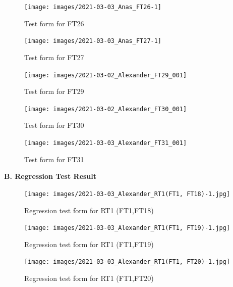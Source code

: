 \documentclass{article}
\begin{document}
 \begin{figure}
     \centering
    \texttt{[image: images/2021-03-03\_Anas\_FT26-1]}
     \renewcommand\figurename{Figure}
     \caption{Test form for FT26}
     \label{fig:my_label}
 \end{figure}
 
 \begin{figure}
     \centering
     \texttt{[image: images/2021-03-03\_Anas\_FT27-1]}
     \renewcommand\figurename{Figure}
     \caption{Test form for FT27}
     \label{fig:my_label}
 \end{figure}
 
 \begin{figure}
     \centering
      \texttt{[image: images/2021-03-02\_Alexander\_FT29\_001]}
     \renewcommand\figurename{Figure}
     \caption{Test form for FT29}
     \label{fig:my_label}
 \end{figure}
 
 \begin{figure}
     \centering
     \texttt{[image: images/2021-03-02\_Alexander\_FT30\_001]}
     \renewcommand\figurename{Figure}
     \caption{Test form for FT30}
     \label{fig:my_label}
 \end{figure}
 
 \begin{figure}
     \centering
     \texttt{[image: images/2021-03-03\_Alexander\_FT31\_001]}
     \renewcommand\figurename{Figure}
     \caption{Test form for FT31}
     \label{fig:my_label}
 \end{figure}


\newpage
\begin{flushleft}
{\large \textbf{B. Regression Test Result}}
\end{flushleft}


 \begin{figure}
     \centering
      \texttt{[image: images/2021-03-03\_Alexander\_RT1(FT1, FT18)-1.jpg]}
     \renewcommand\figurename{Figure}
     \caption{Regression test form for RT1 (FT1,FT18)}
     \label{fig:my_label}
 \end{figure}
 
  \begin{figure}
     \centering
      \texttt{[image: images/2021-03-03\_Alexander\_RT1(FT1, FT19)-1.jpg]}
     \renewcommand\figurename{Figure}
     \caption{Regression test form for RT1 (FT1,FT19)}
     \label{fig:my_label}
 \end{figure}
 
  \begin{figure}
     \centering
      \texttt{[image: images/2021-03-03\_Alexander\_RT1(FT1, FT20)-1.jpg]}
     \renewcommand\figurename{Figure}
     \caption{Regression test form for RT1 (FT1,FT20)}
     \label{fig:my_label}
 \end{figure}
 
\end{document}
